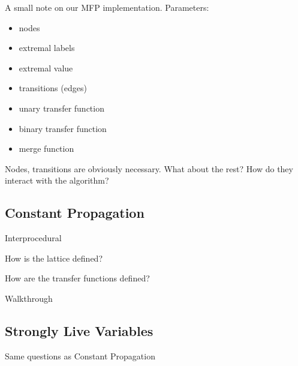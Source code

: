 \documentclass{article}
\begin{document}
A small note on our MFP implementation. Parameters:

\begin{itemize}
	\item nodes
	\item extremal labels
	\item extremal value
	\item transitions (edges)
	\item unary transfer function
	\item binary transfer function
	\item merge function
\end{itemize}

Nodes, transitions are obviously necessary. What about the rest? How do they interact with the algorithm?

\subsection*{Constant Propagation}

Interprocedural

How is the lattice defined?

How are the transfer functions defined?

Walkthrough

\subsection*{Strongly Live Variables}

Same questions as Constant Propagation
\end{document}
